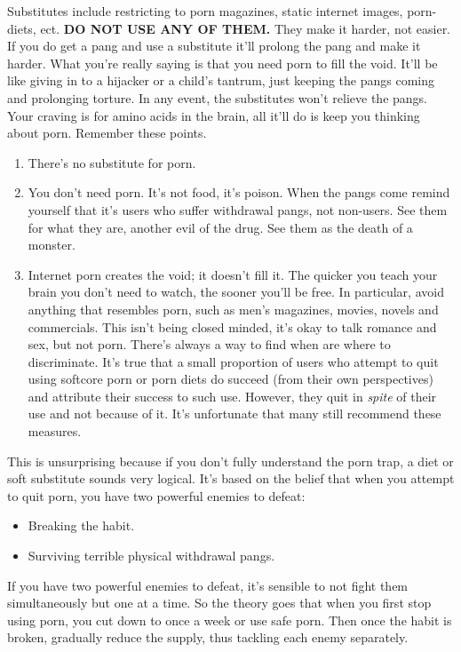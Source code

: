 \documentclass[easypeasy.tex]{subfiles}
\begin{document}
Substitutes include restricting to porn magazines, static internet images, porn-diets, ect. \textbf{DO NOT USE ANY OF THEM.} They make it harder, not easier. If you do get a pang and use a substitute it'll prolong the pang and make it harder. What you're really saying is that you need porn to fill the void. It'll be like giving in to a hijacker or a child's tantrum, just keeping the pangs coming and prolonging torture. In any event, the substitutes won't relieve the pangs. Your craving is for amino acids in the brain, all it'll do is keep you thinking about porn. Remember these points.
\begin{enumerate}
  \item There's no substitute for porn.
  \item You don't need porn. It's not food, it's poison. When the pangs come remind yourself that it's users who suffer withdrawal pangs, not non-users. See them for what they are, another evil of the drug. See them as the death of a monster.
  \item Internet porn creates the void; it doesn't fill it. The quicker you teach your brain you don't need to watch, the sooner you'll be free. In particular, avoid anything that resembles porn, such as men's magazines, movies, novels and commercials. This isn't being closed minded, it's okay to talk romance and sex, but not porn. There's always a way to find when are where to discriminate. It's true that a small proportion of users who attempt to quit using softcore porn or porn diets do succeed (from their own perspectives) and attribute their success to such use. However, they quit in \textit{spite} of their use and not because of it. It's unfortunate that many still recommend these measures.
\end{enumerate}

This is unsurprising because if you don't fully understand the porn trap, a diet or soft substitute sounds very logical. It's based on the belief that when you attempt to quit porn, you have two powerful enemies to defeat:
\begin{itemize}
  \item Breaking the habit.
  \item Surviving terrible physical withdrawal pangs.
\end{itemize}

If you have two powerful enemies to defeat, it's sensible to not fight them simultaneously but one at a time. So the theory goes that when you first stop using porn, you cut down to once a week or use safe porn. Then once the habit is broken, gradually reduce the supply, thus tackling each enemy separately.
\end{document}

